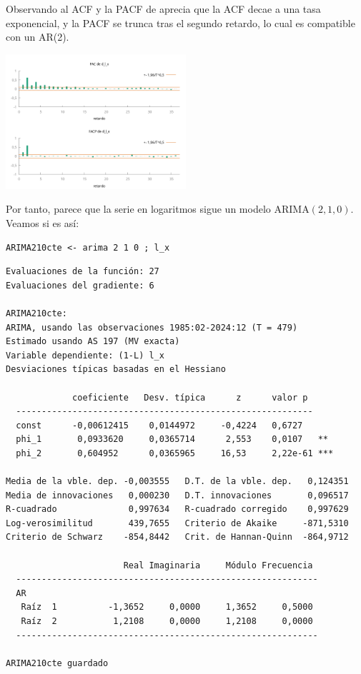 \documentclass[10pt]{article}
\begin{document}
Observando al ACF y la PACF de aprecia que la ACF decae a una tasa
exponencial, y la PACF se trunca tras el segundo retardo, lo cual es
compatible con un AR(2). 

\begin{center}
\includegraphics[width=0.5\textwidth]{./EjercicioIdentificacionARIMA/d_l_x_ACF-PACF.png}
\end{center}

Por tanto, parece que la serie en logaritmos sigue un modelo
ARIMA\((2,1,0)\). Veamos si es así:

\begin{verbatim}
ARIMA210cte <- arima 2 1 0 ; l_x 
\end{verbatim}

\begin{verbatim}
Evaluaciones de la función: 27
Evaluaciones del gradiente: 6

ARIMA210cte:
ARIMA, usando las observaciones 1985:02-2024:12 (T = 479)
Estimado usando AS 197 (MV exacta)
Variable dependiente: (1-L) l_x
Desviaciones típicas basadas en el Hessiano

             coeficiente   Desv. típica      z      valor p 
  ----------------------------------------------------------
  const      -0,00612415    0,0144972     -0,4224   0,6727  
  phi_1       0,0933620     0,0365714      2,553    0,0107   **
  phi_2       0,604952      0,0365965     16,53     2,22e-61 ***

Media de la vble. dep. -0,003555   D.T. de la vble. dep.   0,124351
Media de innovaciones   0,000230   D.T. innovaciones       0,096517
R-cuadrado              0,997634   R-cuadrado corregido    0,997629
Log-verosimilitud       439,7655   Criterio de Akaike     -871,5310
Criterio de Schwarz    -854,8442   Crit. de Hannan-Quinn  -864,9712

                       Real Imaginaria     Módulo Frecuencia
  -----------------------------------------------------------
  AR
   Raíz  1          -1,3652     0,0000     1,3652     0,5000
   Raíz  2           1,2108     0,0000     1,2108     0,0000
  -----------------------------------------------------------

ARIMA210cte guardado
\end{verbatim}
\end{document}
